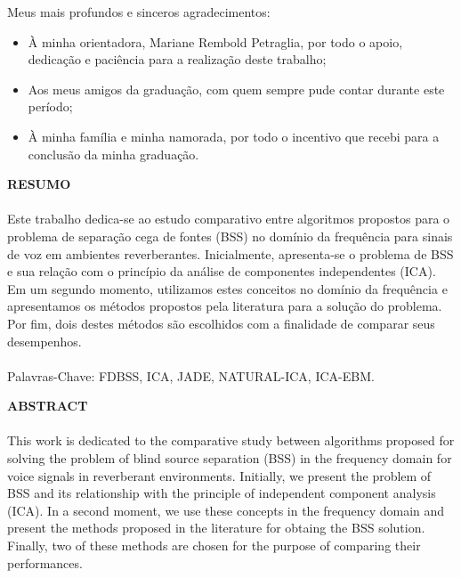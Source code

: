 Meus mais profundos e sinceros agradecimentos:
\begin{itemize}
    \item À minha orientadora, Mariane Rembold Petraglia, por todo o apoio, dedicação e paciência para a realização deste trabalho;
    \item Aos meus amigos da graduação, com quem sempre pude contar durante este período;
    \item À minha família e minha namorada, por todo o incentivo que recebi para a conclusão da minha graduação.
\end{itemize}

\pagebreak


\begin{center}
\textbf{RESUMO}
\end{center}
      \vspace{0.5cm}

\paragraph{}
Este trabalho dedica-se ao estudo comparativo entre algoritmos propostos para o problema de separação cega de fontes (BSS) no domínio da frequência para sinais de voz em ambientes reverberantes. Inicialmente, apresenta-se o problema de BSS e sua relação com o princípio da análise de componentes independentes (ICA). Em um segundo momento, utilizamos estes conceitos no domínio da frequência e apresentamos os métodos propostos pela literatura para a solução do problema. Por fim, dois destes métodos são escolhidos com a finalidade de comparar seus desempenhos.

\paragraph{}
\noindent Palavras-Chave: FDBSS, ICA, JADE, NATURAL-ICA, ICA-EBM.

\pagebreak


\begin{center}
\textbf{ABSTRACT}
\end{center}
      \vspace{0.5cm}

\paragraph{}

This work is dedicated to the comparative study between algorithms proposed for solving the problem of blind source separation (BSS) in the frequency domain for voice signals in reverberant environments. Initially, we present the problem of BSS and its relationship with the principle of independent component analysis (ICA). In a second moment, we use these concepts in the frequency domain and present the methods proposed in the literature for obtaing the BSS solution. Finally, two of these methods are chosen for the purpose of comparing their performances.

